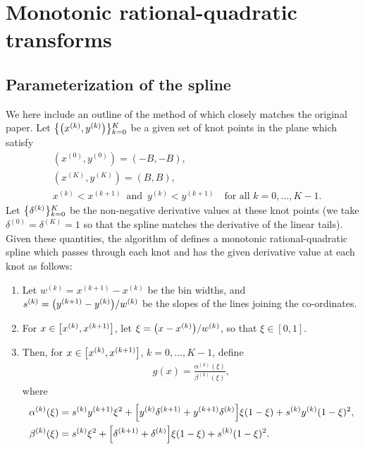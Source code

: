 \section{Monotonic rational-quadratic transforms}
\label{appendix:monotonic-rq-transforms}

\subsection{Parameterization of the spline}
\label{appendix:rq-transform-forward}
We here include an outline of the method of \citet{gregory:1982:rationalquadratic} which closely matches the original paper. 
Let $ \mathopen{}\left\lbrace\mathopen{}\left(x^{(k)}, y^{(k)}\right)\mathclose{}\right\rbrace\mathclose{}_{k=0}^{K} $ be a given set of knot points in the plane which satisfy
\begin{align}
&(x^{(0)}, y^{(0)}) = (-B, -B), \\ &(x^{(K)}, y^{(K)}) = (B, B), \\
&x^{(k)} < x^{(k+1)} \,\text{ and }\, y^{(k)} < y^{(k+1)} \quad\text{for all } k=0, \dots, K-1.
\end{align}
Let $ \mathopen{}\left\lbrace\delta^{(k)}\right\rbrace\mathclose{}_{k=0}^{K} $ be the non-negative derivative values at these knot points (we take $ \delta^{(0)} = \delta^{(K)} = 1 $ so that the spline matches the derivative of the linear tails). 
Given these quantities, the algorithm of \citet{gregory:1982:rationalquadratic} defines a monotonic rational-quadratic spline which passes through each knot and has the given derivative value at each knot as follows:
\begin{enumerate}
    \item Let $ w^{(k)} = x^{(k + 1)} - x^{(k)} $ be the bin widths, and $ s^{(k)} = \mathopen{}\left(y^{(k + 1)} - y^{(k)}\right)\mathclose{}/w^{(k)} $ be the slopes of the lines joining the co-ordinates. 
    \item For $ x \in \mathopen{}\left[x^{(k)}, x^{(k + 1)}\right]\mathclose{} $, let $ \xi = \mathopen{}\left(x - x^{(k)}\right)\mathclose{}/w^{(k)} $, so that $ \xi \in [0, 1] $. 
    \item Then, for $ x \in \mathopen{}\left[x^{(k)}, x^{(k + 1)}\right]\mathclose{} $, $ k = 0, \ldots, K-1 $, define 
    \begin{align}
        g(x) = \frac{\alpha^{(k)}(\xi)}{ \beta^{(k)}(\xi)},
        \label{eq:rq-spline-appendix}
    \end{align}
    where
    \begin{align}
        \alpha^{(k)}(\xi) &= s^{(k)} y^{(k + 1)} \xi^{2} + \mathopen{}\left[y^{(k)} \delta^{(k + 1)} + y^{(k + 1)} \delta^{(k)}\right]\mathclose{} \xi (1 - \xi) + s^{(k)} y^{(k)} (1 - \xi)^{2}, \\
        \beta^{(k)}(\xi) &= s^{(k)} \xi^{2} + \mathopen{}\left[\delta^{(k + 1)} + \delta^{(k)}\right]\mathclose{} \xi (1 - \xi) + s^{(k)} (1 - \xi)^{2}. \label{eqn:betafn}
    \end{align}
\end{enumerate}
